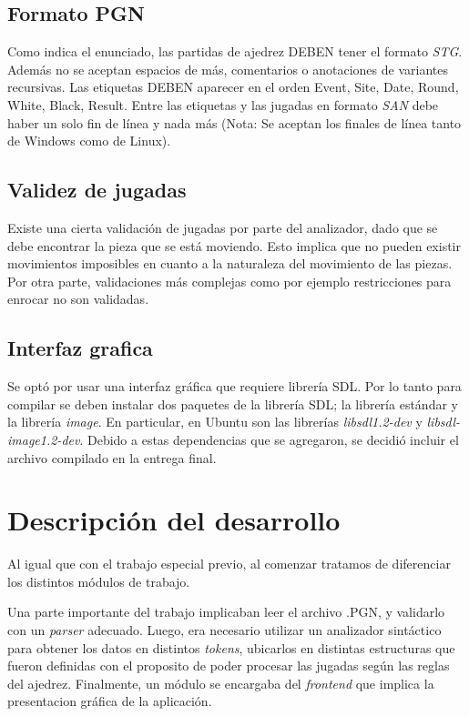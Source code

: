 \documentclass[a4paper,10pt]{article}
\begin{document}
\subsection{Formato PGN}

Como indica el enunciado, las partidas de ajedrez DEBEN tener el formato \textit{STG}. Además no se aceptan espacios de más, comentarios 
o anotaciones de variantes recursivas. Las etiquetas DEBEN aparecer en el orden Event, Site, Date, Round, White, Black, Result.
 Entre las etiquetas y las jugadas en formato \textit{SAN} debe haber un solo fin de línea y nada más (Nota: Se aceptan los finales de línea 
tanto de Windows como de Linux).

\subsection{ Validez de jugadas}

Existe una cierta validación de jugadas por parte del analizador, dado que se debe encontrar la pieza que se está moviendo. Esto implica que 
no pueden existir movimientos imposibles en cuanto a la naturaleza del movimiento de las piezas. Por otra parte, validaciones más complejas como 
por ejemplo restricciones para enrocar no son validadas.

\subsection{ Interfaz grafica}

Se optó por usar una interfaz gráfica que requiere librería SDL. Por lo tanto para compilar se deben instalar dos paquetes de la librería SDL; la librería 
estándar y la librería \textit{image}. En particular, en Ubuntu son las librerías \textit{libsdl1.2-dev} y \textit{libsdl-image1.2-dev}. Debido a estas 
dependencias que se agregaron, se decidió incluir el archivo compilado en la entrega final.

\newpage

\section{Descripción del desarrollo}
  Al igual que con el trabajo especial previo, al comenzar tratamos de diferenciar los distintos módulos de trabajo. 

  Una parte importante del trabajo implicaban leer el archivo .PGN, y validarlo con un \textit{parser} adecuado.
Luego, era necesario utilizar un analizador sintáctico para obtener los datos en distintos \textit{tokens}, ubicarlos en distintas
estructuras que fueron definidas con el proposito de poder procesar las jugadas según las reglas del ajedrez.
Finalmente, un módulo se encargaba del \textit{frontend} que implica la presentacion gráfica de la aplicación.
\end{document}
